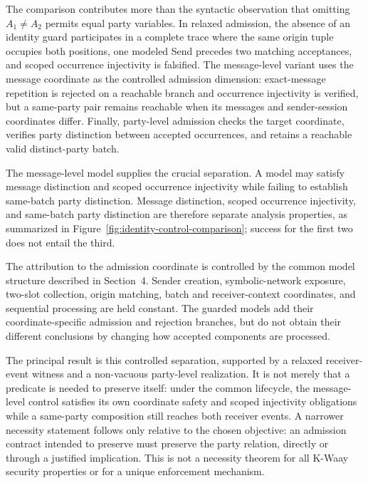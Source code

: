 The comparison contributes more than the syntactic observation that omitting
\(A_1\neq A_2\) permits equal party variables. In relaxed admission, the
absence of an identity guard participates in a complete trace where the same
origin tuple occupies both positions, one modeled Send precedes two matching
acceptances, and scoped occurrence injectivity is falsified. The
message-level variant uses the message coordinate as the controlled admission dimension:
exact-message repetition is rejected on a reachable branch and occurrence
injectivity is verified, but a same-party pair remains reachable when its
messages and sender-session coordinates differ. Finally, party-level
admission checks the target coordinate, verifies party distinction between
accepted occurrences, and retains a reachable valid distinct-party batch.



The message-level model supplies the crucial separation. A model may satisfy
message distinction and scoped occurrence injectivity while failing to
establish same-batch party distinction. Message distinction, scoped occurrence
injectivity, and same-batch party distinction are therefore separate analysis
properties, as summarized
in Figure~\ref{fig:identity-control-comparison}; success for the first two
does not entail the third.

The attribution to the admission coordinate is controlled by the common model
structure described in Section~4. Sender creation, symbolic-network exposure,
two-slot collection, origin matching, batch and receiver-context coordinates,
and sequential processing are held constant. The guarded models add their
coordinate-specific admission and rejection branches, but do not obtain their
different conclusions by changing how accepted components are processed.

The principal result is this controlled separation, supported by a relaxed
receiver-event witness and a non-vacuous party-level realization. It is not
merely that a predicate is needed to preserve itself: under the common
lifecycle, the message-level control satisfies its own coordinate safety and
scoped injectivity obligations while a same-party composition still reaches
both receiver events. A narrower necessity statement follows only relative
to the chosen objective: an admission contract intended to preserve
\distinctparty must preserve the party relation, directly or through a
justified implication. This is not a necessity theorem for all K-Waay security
properties or for a unique enforcement mechanism.

